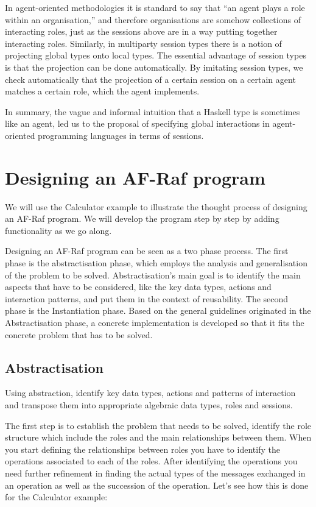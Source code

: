 \documentclass[a4paper,12pt,oneside,fleqn]{book} %
\newcommand{\todo}[1]{[\textcolor{red}{TODO}: #1]}
\begin{document}
In agent-oriented methodologies it is standard to say that ``an agent plays
a role within an organisation,'' and therefore organisations are somehow
collections of interacting roles, just as the sessions above are in a way
putting together interacting roles. Similarly, in multiparty session types
there is a notion of projecting global types onto local types. The
essential advantage of session types is that the projection can be done
automatically. By imitating session types, we check automatically that the
projection of a certain session on a certain agent matches a certain role,
which the agent implements.

In summary, the vague and informal intuition that a Haskell type is
sometimes like an agent, led us to the proposal of specifying global
interactions in agent-oriented programming languages in terms of sessions.

\section{Designing an AF-Raf program}\label{sec:c-example} %
We will use the Calculator example to illustrate the thought process of
designing an AF-Raf program. We will develop the program step by step by
adding functionality as we go along.

Designing an AF-Raf program can be seen as a two phase process. The first
phase is the abstractisation phase, which employs the analysis and
generalisation of the problem to be solved. Abstractisation's main goal is to
identify the main aspects that have to be considered, like the key data
types, actions and interaction patterns, and put them in the context of
reusability. The second phase is the Instantiation phase. Based on the
general guidelines originated in the Abstractisation phase, a concrete
implementation is developed so that it fits the concrete problem that has
to be solved.
\subsection{Abstractisation} %
Using abstraction, identify key data types, actions and patterns of
interaction and transpose them into appropriate algebraic data types, roles
and sessions.

The first step is to establish the problem that needs to be solved, identify
the role structure which include the roles and the main relationships
between them. When you start defining the relationships between roles you
have to identify the operations associated to each of the roles. After
identifying the operations you need further refinement in finding the
actual types of the messages exchanged in an operation as well as the
succession of the operation. Let's see how this is done for the Calculator
example:
\end{document}

